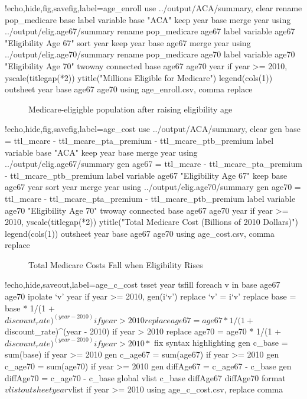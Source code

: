 \documentclass{article}
\begin{document}
\begin{Statacode}{!echo,hide,fig,savefig,label=age_enroll}
use ../output/ACA/summary, clear
rename pop_medicare base
label variable base "ACA"
keep year base
merge year using ../output/elig.age67/summary
rename pop_medicare age67
label variable age67 "Eligibility Age 67"
sort year
keep year base age67
merge year using ../output/elig.age70/summary
rename pop_medicare age70
label variable age70 "Eligibility Age 70"
twoway connected base age67 age70 year if year >= 2010, yscale(titlegap(*2)) ytitle("Millions Eligible for Medicare") legend(cols(1))
outsheet year base age67 age70 using age_enroll.csv, comma replace
\end{Statacode}

\begin{figure}[ht]
\centering
{}
\caption{Medicare-eligigble population after raising eligibility age}
\label{fig:age_enroll}
\end{figure}

\begin{Statacode}{!echo,hide,fig,savefig,label=age_cost}
use ../output/ACA/summary, clear
gen base = ttl_mcare - ttl_mcare_pta_premium - ttl_mcare_ptb_premium
label variable base "ACA"
keep year base
merge year using ../output/elig.age67/summary
gen age67 = ttl_mcare - ttl_mcare_pta_premium - ttl_mcare_ptb_premium
label variable age67 "Eligibility Age 67"
keep base age67 year
sort year
merge year using ../output/elig.age70/summary
gen age70 = ttl_mcare - ttl_mcare_pta_premium - ttl_mcare_ptb_premium
label variable age70 "Eligibility Age 70"
twoway connected base age67 age70 year if year >= 2010, yscale(titlegap(*2)) ytitle("Total Medicare Cost (Billions of 2010 Dollars)") legend(cols(1))
outsheet year base age67 age70 using age_cost.csv, comma replace
\end{Statacode}

\begin{figure}[ht]
\centering
{}
\caption{Total Medicare Costs Fall when Eligibility Rises}
\label{fig:age_cost}
\end{figure}

\begin{Statacode}{!echo,hide,saveout,label=age_c_cost}
tsset year
tsfill
foreach v in base age67 age70 {
  ipolate `v' year if year >= 2010, gen(i`v')
  replace `v' = i`v'
}
replace base = base * 1/(1 + $discount_rate)^(year - 2010) if year > 2010
replace age67 = age67 * 1/(1 + $discount_rate)^(year - 2010) if year > 2010
replace age70 = age70 * 1/(1 + $discount_rate)^(year - 2010) if year > 2010
* $ fix syntax highlighting
gen c_base = sum(base) if year >= 2010
gen c_age67 = sum(age67) if year >= 2010
gen c_age70 = sum(age70) if year >= 2010
gen diffAge67 = c_age67 - c_base
gen diffAge70 = c_age70 - c_base
global vlist c_base diffAge67 diffAge70
format $vlist %
outsheet year $vlist if year >= 2010 using age_c_cost.csv, replace comma
\end{Statacode}
\end{document}
